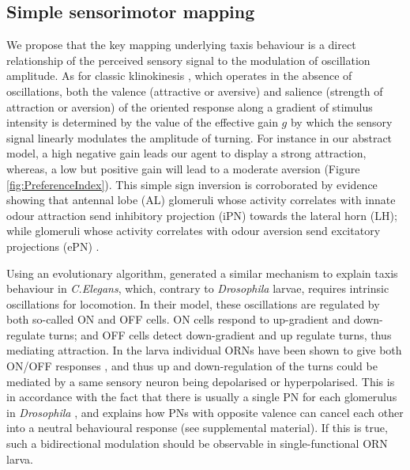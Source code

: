 \documentclass[11pt,a4paper]{article}
\newcommand{\Dros }{\emph{Drosophila }}
\newcommand{\todoAW}[1]{\todo[author=AW,color=green, size=\tiny,inline]{#1}}
\newcommand{\todoBW}[1]{\todo[author=BW,color=orange, size=\tiny,inline]{#1}}
\newcommand{\todoML}[1]{\todo[author=ML,color=white, size=\tiny,inline]{#1}}
\begin{document}
\subsection{Simple sensorimotor mapping}
We propose that the key mapping underlying taxis behaviour is a direct relationship of the perceived sensory signal to the modulation of oscillation amplitude.
As for classic klinokinesis \citep{benhamou1989animals}, which operates in the absence of oscillations, both the valence (attractive or aversive) and salience (strength of attraction or aversion) of the oriented response along a gradient of stimulus intensity is determined by the value of the effective gain $g$ by which the sensory signal linearly modulates the amplitude of turning. For instance in our abstract model, a high negative gain leads our agent to display a strong attraction, whereas, a low but positive gain will lead to a moderate aversion (Figure \ref{fig:PreferenceIndex}). This simple sign inversion is corroborated by evidence showing that antennal lobe (AL) glomeruli whose activity correlates with innate odour attraction send inhibitory projection (iPN) towards the lateral horn (LH); while glomeruli whose activity correlates with odour aversion send excitatory projections (ePN) \citep{liang2013gabaergic, knaden2012spatial}. 

Using an evolutionary algorithm, \cite{izquierdo2010evolution} generated a similar mechanism to explain taxis behaviour in {\it C.Elegans}, which, contrary to \Dros larvae, requires intrinsic oscillations for locomotion.
 In their model, these oscillations are regulated by both so-called ON and OFF cells. ON cells respond to up-gradient and down-regulate turns; and OFF cells detect down-gradient and up regulate turns, thus mediating attraction.
  In the larva individual ORNs have been shown to give both ON/OFF responses \citep{schulze2015dynamical}, and thus up and down-regulation of the turns could be mediated by a same sensory neuron being depolarised or hyperpolarised.
   This is in accordance with the fact that there is usually a single PN for each glomerulus in \Dros \citep{ramaekers2005glomerular}, %
 and explains how PNs with opposite valence can cancel each other into a neutral behavioural response (see supplemental material). If this is true, such a bidirectional modulation should be observable in single-functional ORN larva. 
  
\end{document}

